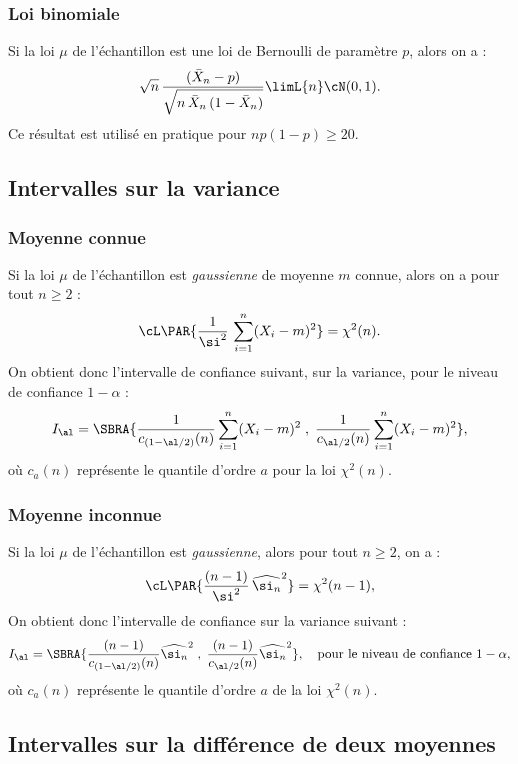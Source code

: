 \subsubsection{Loi binomiale} 

Si la loi $\mu$ de l'échantillon est une loi de Bernoulli de paramètre $p$,
alors on a :
$$
\sqrt{n}\,\frac{(\bar{X}_n-p)}{\sqrt{n\,\bar{X}_n\,(1-\bar{X}_n)}}
\limL{n}\cN(0,1).
$$
Ce résultat est utilisé en pratique pour $np(1-p)\geq 20$.


\subsection{Intervalles sur la variance} 


\subsubsection{Moyenne connue} 

Si la loi $\mu$ de l'échantillon est \emph{gaussienne} de moyenne $m$ connue,
alors on a pour tout $n \geq 2$ :
$$
\cL\PAR{\frac{1}{\si^2}\,\sum_{i=1}^n (X_i-m)^2}= \chi^2 (n).
$$
On obtient donc l'intervalle de confiance suivant, sur la variance, pour le
niveau de confiance $1-\alpha$ :
$$
I_\al=\SBRA{\frac{1}{c_{(1-\al/2)}(n)}\sum_{i=1}^n (X_i-m)^2\;,\;
  \frac{1}{c_{\al/2}(n)}\sum_{i=1}^n (X_i-m)^2},
$$
où $c_a(n)$ représente le quantile d'ordre $a$ pour la loi $\chi^2(n)$.

\subsubsection{Moyenne inconnue} 

Si la loi $\mu$ de l'échantillon est \emph{gaussienne}, alors
pour tout $n \geq 2$, on a :
$$
\cL\PAR{\frac{(n-1)}{\si^2}\,\widehat{\si_n}^2} = \chi^2 (n-1),
$$
On obtient donc l'intervalle de confiance sur la variance suivant :
$$
I_\al=\SBRA{\frac{(n-1)}{c_{(1-\al/2)}(n)}\widehat{\si_n}^2\;,\; 
  \frac{(n-1)}{c_{\al/2}(n)}\widehat{\si_n}^2},
\text{\quad pour le niveau de confiance $1-\alpha$},
$$
où $c_a(n)$ représente le quantile d'ordre $a$ de la loi $\chi^2(n)$.

\subsection{Intervalles sur la différence de deux moyennes}

